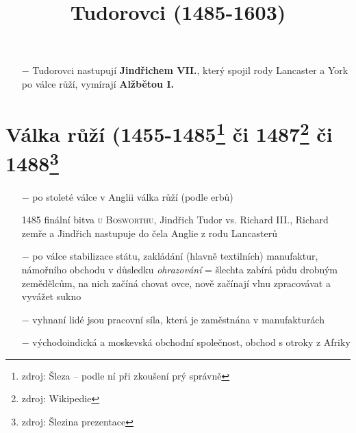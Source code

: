 \documentclass{article}
\title{\vspace{-2cm}Tudorovci (1485-1603)\vspace{-1.7cm}}
\date{}
\author{}
\begin{document}
\maketitle

\begin{itemize}
    \vspace{-0.5em}
    \setlength\itemsep{0.15em}
    \item[$-$] Tudorovci nastupují \textbf{Jindřichem VII.}, který spojil rody Lancaster a York po válce růží, vymírají \textbf{Alžbětou I.}
\end{itemize}

\section*{Válka růží (1455-1485\footnote{zdroj: Šleza -- podle ní při zkoušení prý správně} či 1487\footnote{zdroj: Wikipedie} či 1488\footnote{zdroj: Šlezina prezentace}}
\begin{itemize}
    \vspace{-0.5em}
    \setlength\itemsep{0.15em}
    \item[$-$] po stoleté válce v Anglii válka růží (podle erbů)
    \item[1485] finální bitva \textsc{u Bosworthu}, Jindřich Tudor vs. Richard III., Richard zemře a Jindřich nastupuje do čela Anglie z rodu Lancasterů
    \item[$-$] po válce stabilizace státu, zakládání (hlavně textilních) manufaktur, námořního obchodu v důsledku \textit{ohrazování} = šlechta zabírá půdu drobným zemědělcům, na nich začíná chovat ovce, nově začínají vlnu zpracovávat a vyvážet sukno
    \item[$-$] vyhnaní lidé jsou pracovní síla, která je zaměstnána v manufakturách
    \item[$-$] východoindická a moskevská obchodní společnost, obchod s otroky z Afriky
\end{itemize}
\end{document}
